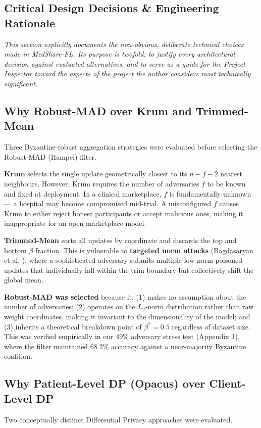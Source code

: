 \documentclass[10pt, a4paper, twocolumn]{article}
\begin{document}
\subsection{Critical Design Decisions \& Engineering Rationale}

\textit{This section explicitly documents the non-obvious, deliberate technical choices made in MedShare-FL. Its purpose is twofold: to justify every architectural decision against evaluated alternatives, and to serve as a guide for the Project Inspector toward the aspects of the project the author considers most technically significant.}

\subsection{Why Robust-MAD over Krum and Trimmed-Mean}
Three Byzantine-robust aggregation strategies were evaluated before selecting the Robust-MAD (Hampel) filter.

\textbf{Krum} \cite{blanchard2017} selects the single update geometrically closest to its $n-f-2$ nearest neighbours. However, Krum requires the number of adversaries $f$ to be known and fixed at deployment. In a clinical marketplace, $f$ is fundamentally unknown --- a hospital may become compromised mid-trial. A misconfigured $f$ causes Krum to either reject honest participants or accept malicious ones, making it inappropriate for an open marketplace model.

\textbf{Trimmed-Mean} sorts all updates by coordinate and discards the top and bottom $\beta$ fraction. This is vulnerable to \textbf{targeted norm attacks} (Bagdasaryan et al. \cite{bagdasaryan2020}), where a sophisticated adversary submits multiple low-norm poisoned updates that individually fall within the trim boundary but collectively shift the global mean.

\textbf{Robust-MAD was selected} because it: (1) makes no assumption about the number of adversaries; (2) operates on the $L_2$-norm distribution rather than raw weight coordinates, making it invariant to the dimensionality of the model; and (3) inherits a theoretical breakdown point of $\beta^* = 0.5$ regardless of dataset size. This was verified empirically in our 49\% adversary stress test (Appendix J), where the filter maintained 68.2\% accuracy against a near-majority Byzantine coalition.

\subsection{Why Patient-Level DP (Opacus) over Client-Level DP}
Two conceptually distinct Differential Privacy approaches were evaluated.
\end{document}
